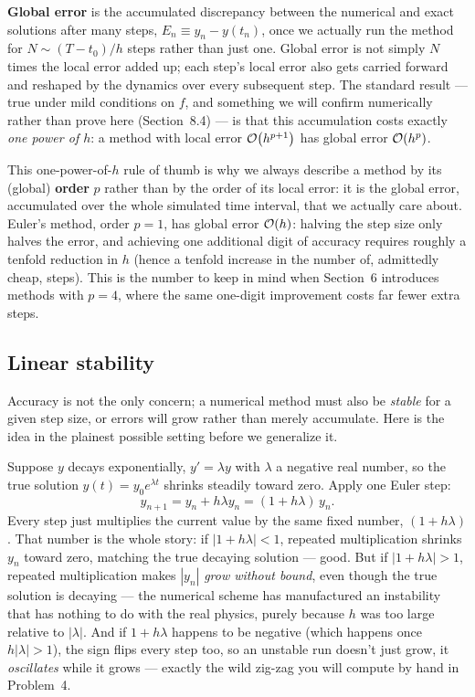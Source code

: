 \textbf{Global error} is the accumulated discrepancy between the numerical and exact solutions after many steps, $E_n \equiv y_n - y(t_n)$, once we actually run the method for $N \sim (T-t_0)/h$ steps rather than just one. Global error is not simply $N$ times the local error added up; each step's local error also gets carried forward and reshaped by the dynamics over every subsequent step. The standard result --- true under mild conditions on $f$, and something we will confirm numerically rather than prove here (Section~8.4) --- is that this accumulation costs exactly \emph{one power of $h$}: a method with local error $\mathcal{O}\!\left(h^{p+1}\right)$ has global error $\mathcal{O}\!\left(h^p\right)$.

\begin{remark}
This one-power-of-$h$ rule of thumb is why we always describe a method by its (global) \textbf{order} $p$ rather than by the order of its local error: it is the global error, accumulated over the whole simulated time interval, that we actually care about. Euler's method, order $p=1$, has global error $\mathcal{O}\!\left(h\right)$: halving the step size only halves the error, and achieving one additional digit of accuracy requires roughly a tenfold reduction in $h$ (hence a tenfold increase in the number of, admittedly cheap, steps). This is the number to keep in mind when Section~6 introduces methods with $p=4$, where the same one-digit improvement costs far fewer extra steps.
\end{remark}

\subsection{Linear stability}

Accuracy is not the only concern; a numerical method must also be \emph{stable} for a given step size, or errors will grow rather than merely accumulate. Here is the idea in the plainest possible setting before we generalize it.

Suppose $y$ decays exponentially, $y'=\lambda y$ with $\lambda$ a negative real number, so the true solution $y(t)=y_0 e^{\lambda t}$ shrinks steadily toward zero. Apply one Euler step:
\begin{equation}
y_{n+1} = y_n + h\lambda y_n = (1+h\lambda)\,y_n.
\end{equation}
Every step just multiplies the current value by the same fixed number, $(1+h\lambda)$. That number is the whole story: if $|1+h\lambda| < 1$, repeated multiplication shrinks $y_n$ toward zero, matching the true decaying solution --- good. But if $|1+h\lambda|>1$, repeated multiplication makes $|y_n|$ \emph{grow without bound}, even though the true solution is decaying --- the numerical scheme has manufactured an instability that has nothing to do with the real physics, purely because $h$ was too large relative to $|\lambda|$. And if $1+h\lambda$ happens to be negative (which happens once $h|\lambda|>1$), the sign flips every step too, so an unstable run doesn't just grow, it \emph{oscillates} while it grows --- exactly the wild zig-zag you will compute by hand in Problem~4.

